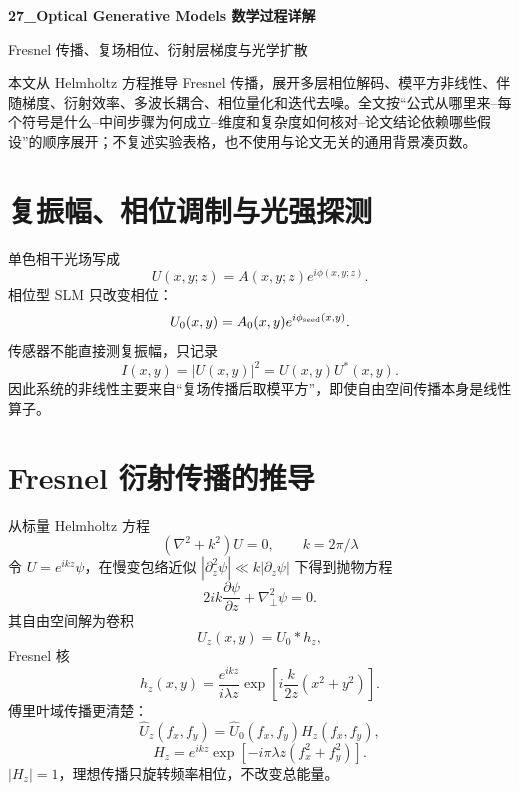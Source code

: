 \documentclass[UTF8,12pt,a4paper,fontset=none]{ctexart}
\numberwithin{equation}{section}
\begin{document}
\begin{center}
{\LARGE\bfseries 27\_Optical Generative Models 数学过程详解}\par
\vspace{0.35em}
{\large Fresnel 传播、复场相位、衍射层梯度与光学扩散}
\end{center}
\vspace{0.45em}
\begin{keybox}[本文只处理真正需要推导的部分]
本文从 Helmholtz 方程推导 Fresnel 传播，展开多层相位解码、模平方非线性、伴随梯度、衍射效率、多波长耦合、相位量化和迭代去噪。全文按“公式从哪里来--每个符号是什么--中间步骤为何成立--维度和复杂度如何核对--论文结论依赖哪些假设”的顺序展开；不复述实验表格，也不使用与论文无关的通用背景凑页数。
\end{keybox}
\tableofcontents
\newpage

\section{复振幅、相位调制与光强探测}
单色相干光场写成
\begin{equation}
 U(x,y;z)=A(x,y;z)e^{i\phi(x,y;z)}.
\end{equation}
相位型 SLM 只改变相位：
\begin{equation}
 U_0(x,y)=A_0(x,y)e^{i\phi_{\rm seed}(x,y)}.
\end{equation}
传感器不能直接测复振幅，只记录
\begin{equation}
 \boxed{I(x,y)=|U(x,y)|^2=U(x,y)U^*(x,y)}.
\end{equation}
因此系统的非线性主要来自“复场传播后取模平方”，即使自由空间传播本身是线性算子。

\section{Fresnel 衍射传播的推导}
从标量 Helmholtz 方程
\begin{equation}
 (\nabla^2+k^2)U=0,\qquad k=2\pi/\lambda
\end{equation}
令 $U=e^{ikz}\psi$，在慢变包络近似 $|\partial_z^2\psi|\ll k|\partial_z\psi|$ 下得到抛物方程
\begin{equation}
 2ik\frac{\partial\psi}{\partial z}+\nabla_\perp^2\psi=0.
\end{equation}
其自由空间解为卷积
\begin{equation}
 U_z(x,y)=U_0*h_z,
\end{equation}
Fresnel 核
\begin{equation}
 h_z(x,y)=\frac{e^{ikz}}{i\lambda z}
 \exp\left[i\frac{k}{2z}(x^2+y^2)\right].
\end{equation}
傅里叶域传播更清楚：
\begin{equation}
 \widehat U_z(f_x,f_y)=\widehat U_0(f_x,f_y)H_z(f_x,f_y),
\end{equation}
\begin{equation}
 H_z= e^{ikz}\exp[-i\pi\lambda z(f_x^2+f_y^2)].
\end{equation}
$|H_z|=1$，理想传播只旋转频率相位，不改变总能量。
\end{document}
